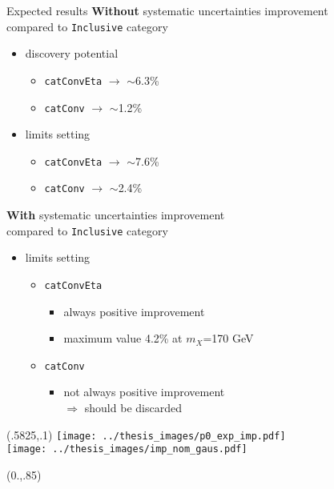 \documentclass[10pt,UKenglish, leqno, xcolor = dvipsnames]{beamer}
\begin{document}
	\begin{frame}{Expected results}
		\vfill
		\textbf{Without} systematic uncertainties improvement\\ compared to \texttt{Inclusive} category
		\begin{itemize}
			\item discovery potential
			\begin{itemize}
				\item \texttt{catConvEta} $\to$ $\sim$6.3\%
				\item \texttt{catConv} $\to$ $\sim$1.2\%
			\end{itemize}
			\item limits setting
			\begin{itemize}
				\item \texttt{catConvEta} $\to$ $\sim$7.6\%
				\item \texttt{catConv} $\to$ $\sim$2.4\%
			\end{itemize}
		\end{itemize}
		\textbf{With} systematic uncertainties improvement\\ compared to \texttt{Inclusive} category
		\begin{itemize}
			\item limits setting
			\begin{itemize}
				\item \texttt{catConvEta}
				\begin{itemize}
					\item always positive improvement
					\item maximum value 4.2\% at $m_X$=170 GeV
				\end{itemize}
				\item \texttt{catConv}
				\begin{itemize}
					\item not always positive improvement\\
					$\Rightarrow$ should be discarded
				\end{itemize}
			\end{itemize}
		\end{itemize}
		\vspace{.5cm}
		\vfill
		\begin{textblock}{1}(.5825,.1)	
			\texttt{[image: ../thesis\_images/p0\_exp\_imp.pdf]}\\
			\texttt{[image: ../thesis\_images/imp\_nom\_gaus.pdf]}	
		\end{textblock}
		\begin{textblock}{1}(0.,.85)

\end{textblock}
\end{frame}
\end{document}
